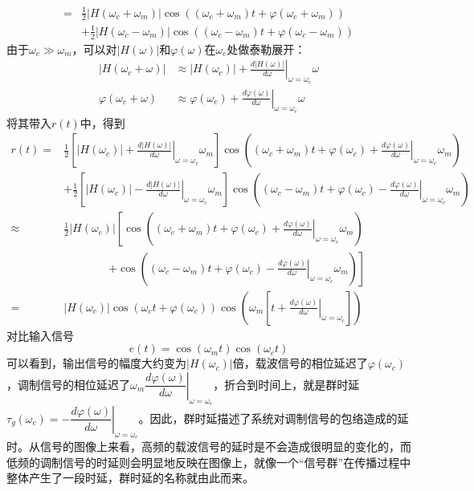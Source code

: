 \documentclass{ctexbook}
\begin{document}
\begin{example}[群时延]
\begin{align*}
    =&\frac{1}{2}|H(\omega_c+\omega_m)|\cos((\omega_c+\omega_m)t+\varphi(\omega_c+\omega_m))\\
    &+\frac{1}{2}\left|H(\omega_c-\omega_m)\right|\cos\left((\omega_c-\omega_m)t+\varphi(\omega_c-\omega_m)\right)
\end{align*}
由于$\omega_c\gg \omega_m$，可以对$|H(\omega)|$和$\varphi(\omega)$在$\omega_c$处做泰勒展开：
\begin{align*}
    |H(\omega_c+\omega)|&\approx |H(\omega_c)|+\left.\frac{d|H(\omega)|}{d\omega}\right|_{\omega=\omega_c}\omega\\
    \varphi(\omega_c+ \omega)&\approx \varphi(\omega_c)+\left.\frac{d\varphi(\omega)}{d\omega}\right|_{\omega=\omega_c}\omega
\end{align*}
将其带入$r(t)$中，得到
\begin{align*}
    r(t)=&\frac{1}{2}\left[|H(\omega_c)|+\left.\frac{d|H(\omega)|}{d\omega}\right|_{\omega=\omega_c}\omega_m\right]\cos\left((\omega_c+\omega_m)t+\varphi(\omega_c)+\left.\frac{d\varphi(\omega)}{d\omega}\right|_{\omega=\omega_c}\omega_m\right)\\
    &+\frac{1}{2}\left[|H(\omega_c)|-\left.\frac{d|H(\omega)|}{d\omega}\right|_{\omega=\omega_c}\omega_m\right]\cos\left((\omega_c-\omega_m)t+\varphi(\omega_c)-\left.\frac{d\varphi(\omega)}{d\omega}\right|_{\omega=\omega_c}\omega_m\right)\\
    \approx&\frac{1}{2}|H(\omega_c)|\left[\cos\left((\omega_c+\omega_m)t+\varphi(\omega_c)+\left.\frac{d\varphi(\omega)}{d\omega}\right|_{\omega=\omega_c}\omega_m\right)\right.\\
    &\qquad\qquad\left.+\cos\left((\omega_c-\omega_m)t+\varphi(\omega_c)-\left.\frac{d\varphi(\omega)}{d\omega}\right|_{\omega=\omega_c}\omega_m\right)\right]\\
    =&|H(\omega_c)|\cos(\omega_c t+\varphi(\omega_c))\cos\left(\omega_m\left[t+\left.\frac{d\varphi(\omega)}{d\omega}\right|_{\omega=\omega_c}\right]\right)
\end{align*}
对比输入信号
\[e(t)=\cos(\omega_m t)\cos(\omega_c t)\]
可以看到，输出信号的幅度大约变为$|H(\omega_c)|$倍，载波信号的相位延迟了$\varphi(\omega_c)$，调制信号的相位延迟了$\omega_m\left.\dfrac{d\varphi(\omega)}{d\omega}\right|_{\omega=\omega_c}$，折合到时间上，就是群时延$\tau_g(\omega_c)=-\left.\dfrac{d\varphi(\omega)}{d\omega}\right|_{\omega=\omega_c}$。因此，群时延描述了系统对调制信号的包络造成的延时。从信号的图像上来看，高频的载波信号的延时是不会造成很明显的变化的，而低频的调制信号的时延则会明显地反映在图像上，就像一个“信号群”在传播过程中整体产生了一段时延，群时延的名称就由此而来。
\end{example}
\end{document}
